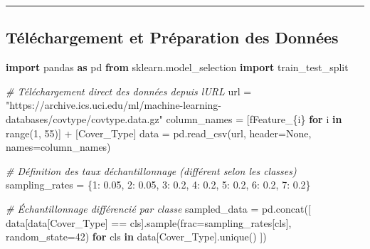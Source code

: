 \documentclass[
  letterpaper,
  DIV=11,
  numbers=noendperiod]{scrartcl}
\newenvironment{Shaded}{}{}
\newcommand{\BuiltInTok}[1]{\textcolor[rgb]{0.00,0.50,0.00}{#1}}
\newcommand{\CommentTok}[1]{\textcolor[rgb]{0.38,0.63,0.69}{\textit{#1}}}
\newcommand{\ControlFlowTok}[1]{\textcolor[rgb]{0.00,0.44,0.13}{\textbf{#1}}}
\newcommand{\DecValTok}[1]{\textcolor[rgb]{0.25,0.63,0.44}{#1}}
\newcommand{\FloatTok}[1]{\textcolor[rgb]{0.25,0.63,0.44}{#1}}
\newcommand{\ImportTok}[1]{\textcolor[rgb]{0.00,0.50,0.00}{\textbf{#1}}}
\newcommand{\KeywordTok}[1]{\textcolor[rgb]{0.00,0.44,0.13}{\textbf{#1}}}
\newcommand{\NormalTok}[1]{#1}
\newcommand{\OperatorTok}[1]{\textcolor[rgb]{0.40,0.40,0.40}{#1}}
\newcommand{\SpecialCharTok}[1]{\textcolor[rgb]{0.25,0.44,0.63}{#1}}
\newcommand{\SpecialStringTok}[1]{\textcolor[rgb]{0.73,0.40,0.53}{#1}}
\newcommand{\StringTok}[1]{\textcolor[rgb]{0.25,0.44,0.63}{#1}}
\newcommand{\VariableTok}[1]{\textcolor[rgb]{0.10,0.09,0.49}{#1}}
\begin{document}
\begin{center}\rule{0.5\linewidth}{0.5pt}\end{center}

\subsection{Téléchargement et Préparation des
Données}\label{tuxe9luxe9chargement-et-pruxe9paration-des-donnuxe9es}

\begin{Shaded}
\begin{Highlighting}[]
\ImportTok{import}\NormalTok{ pandas }\ImportTok{as}\NormalTok{ pd}
\ImportTok{from}\NormalTok{ sklearn.model\_selection }\ImportTok{import}\NormalTok{ train\_test\_split}

\CommentTok{\# Téléchargement direct des données depuis l\textquotesingle{}URL}
\NormalTok{url }\OperatorTok{=} \StringTok{"https://archive.ics.uci.edu/ml/machine{-}learning{-}databases/covtype/covtype.data.gz"}
\NormalTok{column\_names }\OperatorTok{=}\NormalTok{ [}\SpecialStringTok{f\textquotesingle{}Feature\_}\SpecialCharTok{\{}\NormalTok{i}\SpecialCharTok{\}}\SpecialStringTok{\textquotesingle{}} \ControlFlowTok{for}\NormalTok{ i }\KeywordTok{in} \BuiltInTok{range}\NormalTok{(}\DecValTok{1}\NormalTok{, }\DecValTok{55}\NormalTok{)] }\OperatorTok{+}\NormalTok{ [}\StringTok{\textquotesingle{}Cover\_Type\textquotesingle{}}\NormalTok{]}
\NormalTok{data }\OperatorTok{=}\NormalTok{ pd.read\_csv(url, header}\OperatorTok{=}\VariableTok{None}\NormalTok{, names}\OperatorTok{=}\NormalTok{column\_names)}

\CommentTok{\# Définition des taux d\textquotesingle{}échantillonnage (différent selon les classes)}
\NormalTok{sampling\_rates }\OperatorTok{=}\NormalTok{ \{}\DecValTok{1}\NormalTok{: }\FloatTok{0.05}\NormalTok{, }\DecValTok{2}\NormalTok{: }\FloatTok{0.05}\NormalTok{, }\DecValTok{3}\NormalTok{: }\FloatTok{0.2}\NormalTok{, }\DecValTok{4}\NormalTok{: }\FloatTok{0.2}\NormalTok{, }\DecValTok{5}\NormalTok{: }\FloatTok{0.2}\NormalTok{, }\DecValTok{6}\NormalTok{: }\FloatTok{0.2}\NormalTok{, }\DecValTok{7}\NormalTok{: }\FloatTok{0.2}\NormalTok{\}}

\CommentTok{\# Échantillonnage différencié par classe}
\NormalTok{sampled\_data }\OperatorTok{=}\NormalTok{ pd.concat([}
\NormalTok{    data[data[}\StringTok{\textquotesingle{}Cover\_Type\textquotesingle{}}\NormalTok{] }\OperatorTok{==}\NormalTok{ cls].sample(frac}\OperatorTok{=}\NormalTok{sampling\_rates[cls], random\_state}\OperatorTok{=}\DecValTok{42}\NormalTok{)}
    \ControlFlowTok{for}\NormalTok{ cls }\KeywordTok{in}\NormalTok{ data[}\StringTok{\textquotesingle{}Cover\_Type\textquotesingle{}}\NormalTok{].unique()}
\NormalTok{])}


\end{Highlighting}
\end{Shaded}
\end{document}

